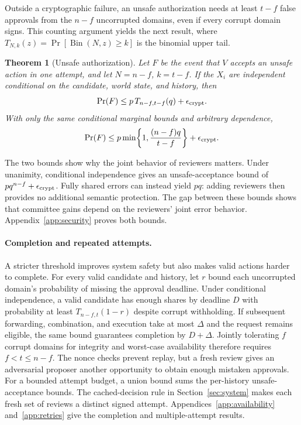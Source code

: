 \documentclass{article}
\newtheorem{theorem}{Theorem}
\begin{document}
Outside a cryptographic failure, an unsafe authorization needs at least
$t-f$ false approvals from the $n-f$ uncorrupted domains, even if every corrupt
domain signs. This counting argument yields the next result, where
$T_{N,k}(z)=\Pr[\operatorname{Bin}(N,z)\ge k]$ is the binomial upper tail.
\begin{theorem}[Unsafe authorization]
\label{thm:semantic}
Let $F$ be the event that $V$ accepts an unsafe action in one attempt, and let
$N=n-f$, $k=t-f$. If the $X_i$ are independent conditional on the candidate,
world state, and history, then
\begin{equation}
 \Pr(F)\le p\,T_{n-f,t-f}(q)+\epsilon_{\rm crypt}.
 \label{eq:unsafe-independent}
\end{equation}
With only the same conditional marginal bounds and arbitrary dependence,
\begin{equation}
 \Pr(F)\le p\min\!\left\{1,\frac{(n-f)q}{t-f}\right\}
             +\epsilon_{\rm crypt}.
 \label{eq:unsafe-dependent}
\end{equation}
\end{theorem}

The two bounds show why the joint behavior of reviewers matters. Under
unanimity, conditional independence gives an unsafe-acceptance bound of
$pq^{n-f}+\epsilon_{\rm crypt}$. Fully shared errors can instead yield $pq$:
adding reviewers then provides no additional semantic protection. The gap between these bounds shows that committee gains depend on the reviewers' joint error behavior. Appendix~\ref{app:security} proves both bounds.

\paragraph{Completion and repeated attempts.}
A stricter threshold improves system safety but also makes valid actions harder to complete. For every
valid candidate and history, let $r$ bound each uncorrupted domain's
probability of missing the approval deadline. Under conditional independence, a valid candidate has enough shares
by deadline $D$ with probability at least $T_{n-f,t}(1-r)$ despite corrupt
withholding. If subsequent forwarding, combination, and execution take at
most $\Delta$ and the request remains eligible, the same bound guarantees
completion by $D+\Delta$. Jointly tolerating $f$ corrupt domains for
integrity and worst-case availability therefore requires $f<t\le n-f$.
The nonce checks prevent replay, but a fresh review gives an adversarial proposer another opportunity to
obtain enough mistaken approvals. For a bounded attempt budget, a union bound
sums the per-history unsafe-acceptance bounds. The cached-decision rule in
Section~\ref{sec:system} makes each fresh set of reviews a distinct signed
attempt. Appendices~\ref{app:availability} and~\ref{app:retries} give the
completion and multiple-attempt results.
\end{document}
